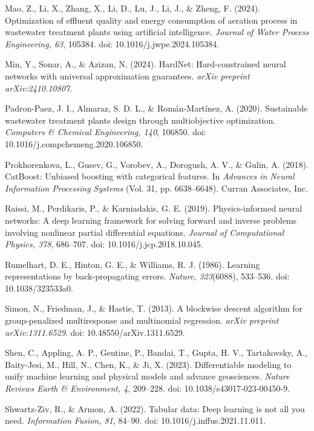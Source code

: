 \documentclass[a4paper,fleqn]{cas-sc}
\begin{document}
\noindent Mao, Z., Li, X., Zhang, X., Li, D., Lu, J., Li, J., \& Zheng, F. (2024). Optimization of effluent quality and energy consumption of aeration process in wastewater treatment plants using artificial intelligence. \textit{Journal of Water Process Engineering, 63}, 105384. doi: 10.1016/j.jwpe.2024.105384.

\noindent Min, Y., Sonar, A., \& Azizan, N. (2024). HardNet: Hard-constrained neural networks with universal approximation guarantees. \textit{arXiv preprint arXiv:2410.10807}.

\noindent Padron-Paez, J. I., Almaraz, S. D. L., \& Rom\'an-Mart\'inez, A. (2020). Sustainable wastewater treatment plants design through multiobjective optimization. \textit{Computers \& Chemical Engineering, 140}, 106850. doi: 10.1016/j.compchemeng.2020.106850.

\noindent Prokhorenkova, L., Gusev, G., Vorobev, A., Dorogush, A. V., \& Gulin, A. (2018). CatBoost: Unbiased boosting with categorical features. In \textit{Advances in Neural Information Processing Systems} (Vol. 31, pp. 6638--6648). Curran Associates, Inc.

\noindent Raissi, M., Perdikaris, P., \& Karniadakis, G. E. (2019). Physics-informed neural networks: A deep learning framework for solving forward and inverse problems involving nonlinear partial differential equations. \textit{Journal of Computational Physics, 378}, 686--707. doi: 10.1016/j.jcp.2018.10.045.

\noindent Rumelhart, D. E., Hinton, G. E., \& Williams, R. J. (1986). Learning representations by back-propagating errors. \textit{Nature, 323}(6088), 533--536. doi: 10.1038/323533a0.

\noindent Simon, N., Friedman, J., \& Hastie, T. (2013). A blockwise descent algorithm for group-penalized multiresponse and multinomial regression. \textit{arXiv preprint arXiv:1311.6529}. doi: 10.48550/arXiv.1311.6529.

\noindent Shen, C., Appling, A. P., Gentine, P., Bandai, T., Gupta, H. V., Tartakovsky, A., Baity-Jesi, M., Hill, N., Chen, K., \& Ji, X. (2023). Differentiable modeling to unify machine learning and physical models and advance geosciences. \textit{Nature Reviews Earth \& Environment, 4}, 209--228. doi: 10.1038/s43017-023-00450-9.

\noindent Shwartz-Ziv, R., \& Armon, A. (2022). Tabular data: Deep learning is not all you need. \textit{Information Fusion, 81}, 84--90. doi: 10.1016/j.inffus.2021.11.011.
\end{document}
